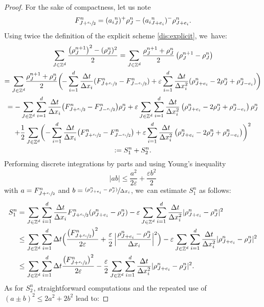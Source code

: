 \documentclass[11pt]{article}
\numberwithin{equation}{section}
\newcommand{\psfrac}[2]{\sfrac{(#1)}{#2}}
\def\ZZ{\mathbb{Z}}
\def\eps{\varepsilon}
\def\dt{\Delta t}
\def\dx{\Delta x}
\theoremstyle{plain}
\theoremstyle{definition}
\begin{document}
\begin{proof}
For the sake of compactness, let us note
\[
F_{J+ \sfrac{e_i}{2}}^n = ({a_i}^n_{J})^+ \rho_{J}^n - ({a_i}^n_{J+e_i})^- \rho_{J+e_i}^n.
\]
Using twice the definition of the explicit scheme \eqref{dis:explicit}, we~have:
\begin{multline*}
\sum_{J \in \ZZ^d} \frac{\big(\rho_J^{n+1}\big)^2 -(\rho_J^n)^2}{2} = \sum_{J \in \ZZ^d} \frac{\rho_J^{n+1}+ \rho_J^n}{2} \left(\rho_J^{n+1}-\rho_J^n\right) \\
= \sum_{J \in \ZZ^d}\! \frac{\rho_J^{n+1} + \rho_J^n}{2} \biggl(\!- \sum_{i=1}^{d} \frac{\dt}{\dx_i}
(F_{J+ \sfrac{e_i}{2}}^n - F_{J- \sfrac{e_i}{2}}^n)+ \eps \sum_{i=1}^{d} \frac{\dt}{\dx_i^2}(\rho_{J+e_i}^n - 2\rho_J^n + \rho_{J-e_i}^n)\biggr) \\
= - \sum_{J \in \ZZ^d} \sum_{i=1}^{d} \frac{\dt}{\dx_i}
\big(F_{J+ \sfrac{e_i}{2}}^n - F_{J- \sfrac{e_i}{2}}^n \big) \rho_J^n + \eps \sum_{J \in \ZZ^d} \sum_{i=1}^{d} \frac{\dt}{\dx_i^2} \left(\rho_{J+e_i}^n - 2\rho_J^n + \rho_{J-e_i}^n \right)\rho_J^n \\
+ \frac 12 \sum_{J \in \ZZ^d} \biggl(- \sum_{i=1}^{d} \frac{\dt}{\dx_i}
\big(F_{J+ \sfrac{e_i}{2}}^n - F_{J- \sfrac{e_i}{2}}^n \big) + \eps \sum_{i=1}^{d} \frac{\dt}{\dx_i^2} \left(\rho_{J+e_i}^n - 2\rho_J^n + \rho_{J-e_i}^n \right)\biggr)^2\\
:= S_1^n + S_2^n.
\end{multline*}
Performing discrete integrations by parts and using Young's inequality
\[
|ab| \leq \frac{a^2}{2\eps} + \frac{\eps b^2}{2}
\]
with $a=F_{J+ \sfrac{e_i}{2}}^n$ and $b=\psfrac{\rho_{J+e_i}^n - \rho_J^n}{\dx_i}$, we~can estimate $S_1^n$ as follows:
\begin{align*}
S_1^n & = \sum_{J \in \ZZ^d} \sum_{i=1}^{d} \frac{\dt}{\dx_i}
F_{J+ \sfrac{e_i}{2}}^n(\rho_{J+e_i}^n - \rho_J^n) - \eps \sum_{J \in \ZZ^d} \sum_{i=1}^{d} \frac{\dt}{\dx_i^2} |\rho_{J+e_i}^n - \rho_J^n|^2 \\
& \leq \sum_{J \in \ZZ^d} \sum_{i=1}^{d} \dt \Bigl(
\frac{\big(F_{J+ \sfrac{e_i}{2}}^n\big)^2}{2\eps} + \frac{\eps}{2}\,\Bigl|\frac{\rho_{J+e_i}^n - \rho_J^n}{\dx_i}\Bigr|^2 \Bigr) - \eps \sum_{J \in \ZZ^d} \sum_{i=1}^{d} \frac{\dt}{\dx_i^2} |\rho_{J+e_i}^n - \rho_J^n|^2 \\
& \leq \sum_{J \in \ZZ^d} \sum_{i=1}^{d} \dt
\frac{\big(F_{J+ \sfrac{e_i}{2}}^n\big)^2}{2\eps} - \frac{\eps}{2} \sum_{J \in \ZZ^d} \sum_{i=1}^{d} \frac{\dt}{\dx_i^2} |\rho_{J+e_i}^n - \rho_J^n|^2.
\end{align*}
As for $S_2^n$, straightforward computations and the repeated use of $(a\pm b)^2 \leq 2a^2+2b^2$ lead to:

\end{proof}
\end{document}
